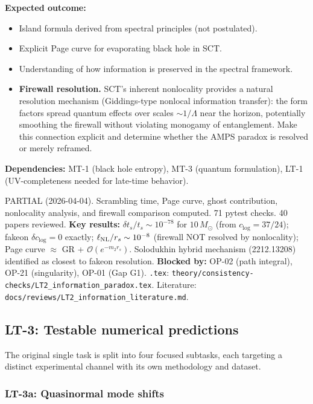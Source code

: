 \documentclass[12pt,a4paper]{article}
\newcommand{\outcome}[1]{\noindent\textbf{Expected outcome:} #1\par}
\newcommand{\deps}[1]{\noindent\textbf{Dependencies:} #1\par}
\begin{document}
\outcome{
\begin{itemize}
  \item Island formula derived from spectral principles (not postulated).
  \item Explicit Page curve for evaporating black hole in SCT.
  \item Understanding of how information is preserved in the spectral framework.
  \item \textbf{Firewall resolution.} SCT's inherent nonlocality provides a
    natural resolution mechanism (Giddings-type nonlocal information transfer):
    the form factors spread quantum effects over scales $\sim 1/\Lambda$ near
    the horizon, potentially smoothing the firewall without violating
    monogamy of entanglement. Make this connection explicit and determine
    whether the AMPS paradox is resolved or merely reframed.
\end{itemize}
}

\deps{MT-1 (black hole entropy), MT-3 (quantum formulation), LT-1 (UV-completeness
needed for late-time behavior).}

\textcolor{near}{PARTIAL (2026-04-04).}
Scrambling time, Page curve, ghost contribution, nonlocality analysis, and
firewall comparison computed.  71 pytest checks.  40 papers reviewed.
\textbf{Key results:}
$\delta t_s/t_s \sim 10^{-78}$ for $10\,M_\odot$ (from $c_{\log}=37/24$);
fakeon $\delta c_{\log}=0$ exactly;
$\ell_{\rm NL}/r_s \sim 10^{-8}$ (firewall NOT resolved by nonlocality);
Page curve $\approx$ GR + $\mathcal{O}(e^{-m_2 r_s})$.
Solodukhin hybrid mechanism (2212.13208) identified as closest to fakeon resolution.
\textbf{Blocked by:} OP-02 (path integral), OP-21 (singularity), OP-01 (Gap G1).
\texttt{.tex}: \texttt{theory/consistency-checks/LT2\_information\_paradox.tex}.
Literature: \texttt{docs/reviews/LT2\_information\_literature.md}.

\subsection{LT-3: Testable numerical predictions}
\label{task:LT3}

The original single task is split into four focused subtasks, each targeting
a distinct experimental channel with its own methodology and dataset.

\subsubsection{LT-3a: Quasinormal mode shifts}
\label{task:LT3a}
\end{document}
